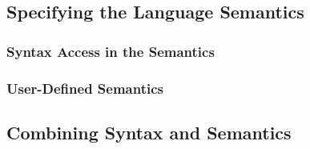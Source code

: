 

\subsection{Specifying the Language Semantics} %
\label{sub:specifying_the_language_semantics}

\subsubsection{Syntax Access in the Semantics} %
\label{ssub:syntax_access_in_the_semantics}


\subsubsection{User-Defined Semantics} %
\label{ssub:user_defined_semantics}



\subsection{Combining Syntax and Semantics} %
\label{sub:combining_syntax_and_semantics}



